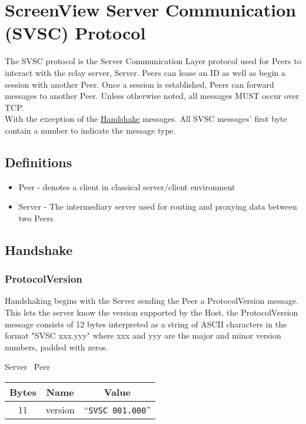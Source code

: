 \section{ScreenView Server Communication (SVSC) Protocol }

The SVSC protocol is the Server Communication Layer protocol used for Peers to interact with the relay server,
Server. Peers can lease an ID as well as begin a session with another Peer. Once a session is established, Peers can
forward messages to another Peer. Unless otherwise noted, all messages MUST occur over TCP.\\

With the exception of the \hyperlink{subsection.4.2}{Handshake} messages. All SVSC messages' first byte contain a
number to indicate
the message type.

\subsection{Definitions}

\begin{itemize}
    \item Peer - denotes a client in classical server/client environment
    \item Server - The intermediary server used for routing and proxying data between two Peers
\end{itemize}

\subsection{Handshake}

\subsubsection{ProtocolVersion}

Handshaking begins with the Server sending the Peer a ProtocolVersion message. This lets the server know
the version supported by the Host. the ProtocolVersion message consists of 12 bytes interpreted as a string of ASCII
characters in the format
"SVSC xxx.yyy" where xxx and yyy are the major and minor version numbers, padded with zeros.

\begin{center}
    Server \textrightarrow\ Peer\\
    \begin{tabular}{|c|c|c|}
        \hline
        \textbf{Bytes} & \textbf{Name} & \textbf{Value}            \\
        \hline
        11             & version       & ``\texttt{SVSC 001.000}'' \\
        \hline
    \end{tabular}
\end{center}

